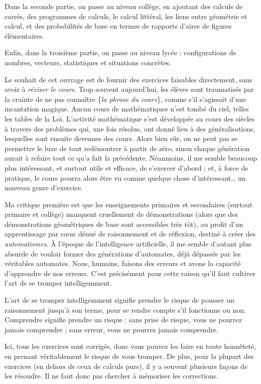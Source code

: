 \documentclass[11pt]{article}
\begin{document}
Dans la seconde partie, on passe au niveau collège, en ajoutant des
calculs de carrés, des programmes de calculs, le calcul littéral, les
liens entre géométrie et calcul, et des probabilités de base en termes
de rapports d’aires de figures élémentaires.


Enfin, dans la troisième partie, on passe au niveau lycée :
configurations de nombres, vecteurs, statistiques et situations
concrètes.


Le souhait de cet ouvrage est de fournir des exercices faisables
directement, sans avoir à \textit{réviser le cours}. Trop souvent
aujourd’hui, les élèves sont traumatisés par la crainte de ne pas
connaître \frquote\{\textit{la phrase du cours}\}, comme s’il s’agissait
d’une incantation magique. Aucun cours de mathématiques n’est tombé du
ciel, telles les tables de la Loi. L’activité mathématique s’est
développée au cours des siècles à travers des problèmes qui, une fois
résolus, ont donné lieu à des généralisations, lesquelles sont ensuite
devenues des cours. Alors bien sûr, on ne peut pas se permettre le
luxe de tout redémontrer à partir de zéro, sinon chaque génération
aurait à refaire tout ce qu’a fait la précédente. Néanmoins, il me
semble beaucoup plus intéressant, et surtout utile et efficace, de
s’exercer d’abord ; et, à force de pratique, le cours pourra alors
être vu comme quelque chose d’intéressant… un nouveau genre
d’exercice.


Ma critique première est que les enseignements primaires et
secondaires (surtout primaire et collège) manquent cruellement de
démonstrations (alors que des démonstrations géométriques de base sont
accessibles très tôt), au profit d’un apprentissage par cœur dénué de
raisonnement et de réflexion, destiné à créer des
\textit{automatismes}. À l’époque de l’intelligence
artificielle, il me semble d’autant plus absurde de vouloir former des
générations d’automates, déjà dépassés par les véritables
automates. Nous, humains, faisons des erreurs et avons la capacité
d’apprendre de nos erreurs. C’est précisément pour cette raison qu’il
faut cultiver l’art de se tromper intelligemment.


L’art de se tromper intelligemment signifie prendre le risque de
pousser un raisonnement jusqu’à son terme, pour se rendre compte s’il
fonctionne ou non. Comprendre signifie prendre un risque : sans prise
de risque, vous ne pourrez jamais comprendre ; sans erreur, vous ne
pourrez jamais comprendre.


Ici, tous les exercices sont corrigés, donc vous pouvez les faire en
toute honnêteté, en prenant véritablement le risque de vous
tromper. De plus, pour la plupart des exercices (en dehors de ceux de
calculs purs), il y a souvent plusieurs façons de les résoudre. Il ne
faut donc pas chercher à mémoriser les corrections.
\end{document}
